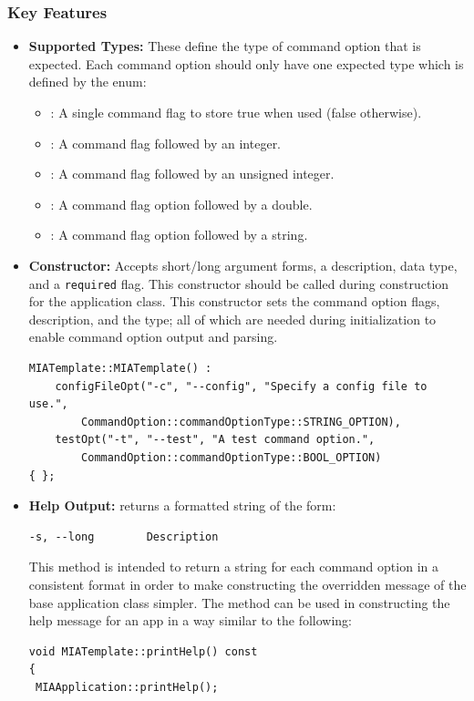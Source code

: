 \subsubsection{Key Features}
\begin{itemize}\itemsep0em
	\item \textbf{Supported Types:} These define the type of command option that is expected. Each command option should only have one expected type which is defined by the  enum:
	\begin{itemize}\itemsep0em
		\item {}: A single command flag to store true when used (false otherwise).
		\item {}: A command flag followed by an integer.
		\item {}: A command flag followed by an unsigned integer.
		\item {}: A command flag option followed by a double.
		\item {}: A command flag option followed by a string.
	\end{itemize}

	\item \textbf{Constructor:} Accepts short/long argument forms, a description, data type, and a \texttt{required} flag. This constructor should be called during construction for the application class. This constructor sets the command option flags, description, and the type; all of which are needed during initialization to enable command option output and parsing.
	\begin{lstlisting}[style=cppstyle]
MIATemplate::MIATemplate() : 
    configFileOpt("-c", "--config", "Specify a config file to use.",
        CommandOption::commandOptionType::STRING_OPTION),
    testOpt("-t", "--test", "A test command option.",
        CommandOption::commandOptionType::BOOL_OPTION)            
{ };
	\end{lstlisting}

	\item \textbf{Help Output:}  returns a formatted string of the form:
	\begin{lstlisting}
-s, --long        Description
	\end{lstlisting}
	This method is intended to return a string for each command option in a consistent format in order to make constructing the overridden  message of the base application class simpler. The  method can be used in constructing the help message for an app in a way similar to the following:
	\begin{lstlisting}[style=cppstyle]
void MIATemplate::printHelp() const
{
 MIAApplication::printHelp();


\end{lstlisting}
\end{itemize}
